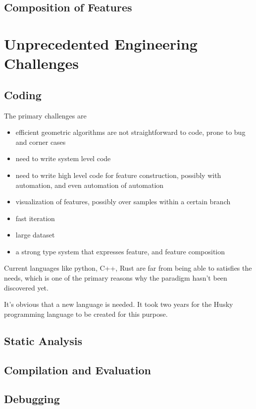 \documentclass[11pt]{article} 	%
\theoremstyle{definition}
\begin{document}
\subsection{Composition of Features}



\section{Unprecedented Engineering Challenges}

\subsection{Coding}

The primary challenges are

\begin{itemize}
	\item efficient geometric algorithms are not straightforward to code, prone to bug and corner cases
	\item need to write system level code
	\item need to write high level code for feature construction, possibly with automation, and even automation of automation
	\item visualization of features, possibly over samples within a certain branch
	\item fast iteration
	\item large dataset
	\item a strong type system that expresses feature, and feature composition
\end{itemize}

Current languages like python, C++, Rust are far from being able to satisfies the needs, which is one of the primary reasons why the paradigm hasn't been discovered yet.

It's obvious that a new language is needed. It took two years for the Husky programming language to be created for this purpose.

\subsection{Static Analysis}

\subsection{Compilation and Evaluation}

\subsection{Debugging}
\end{document}
